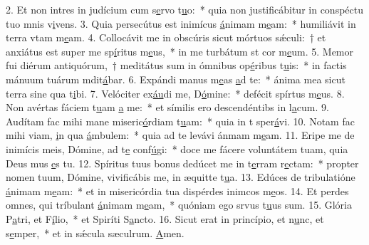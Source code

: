 2. Et non intres in judícium cum s\uline{e}rvo t\uline{u}o:~* quia non justificábitur in conspéctu tuo mnis v\uline{i}vens.
3. Quia persecútus est inimícus \uline{á}nimam m\uline{e}am:~* humiliávit in terra vtam m\uline{e}am.
4. Collocávit me in obscúris sicut mórtuos sǽculi:~† et anxiátus est super me sp\uline{í}ritus m\uline{e}us,~* in me turbátum st cor m\uline{e}um.
5. Memor fui diérum antiquórum,~† meditátus sum in ómnibus op\uline{é}ribus t\uline{u}is:~* in factis mánuum tuárum mdit\uline{á}bar.
6. Expándi manus m\uline{e}as \uline{a}d te:~* ánima mea sicut terra sine qua t\uline{i}bi.
7. Velóciter ex\uline{áu}di me, D\uline{ó}mine:~* defécit spírtus m\uline{e}us.
8. Non avértas fáciem t\uline{u}am \uline{a} me:~* et símilis ero descendéntibs in l\uline{a}cum.
9. Audítam fac mihi mane miseric\uline{ó}rdiam t\uline{u}am:~* quia in t sper\uline{á}vi.
10. Notam fac mihi viam, \uline{i}n qua \uline{á}mbulem:~* quia ad te levávi ánmam m\uline{e}am.
11. Eripe me de inimícis meis, Dómine, ad t\uline{e} conf\uline{ú}gi:~* doce me fácere voluntátem tuam, quia Deus mus \uline{e}s tu.
12. Spíritus tuus bonus dedúcet me in t\uline{e}rram r\uline{e}ctam:~* propter nomen tuum, Dómine, vivificábis me, in æquitte t\uline{u}a.
13. Edúces de tribulatióne \uline{á}nimam m\uline{e}am:~* et in misericórdia tua dispérdes inimcos m\uline{e}os.
14. Et perdes omnes, qui tríbulant \uline{á}nimam m\uline{e}am,~* quóniam ego srvus t\uline{u}us sum.
15. Glória P\uline{a}tri, et F\uline{í}lio,~* et Spiríti S\uline{a}ncto.
16. Sicut erat in princípio, et n\uline{u}nc, et s\uline{e}mper,~* et in sǽcula sæculrum. \uline{A}men.

